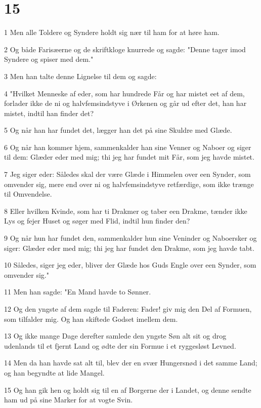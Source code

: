 \chapter{15}

\par 1 Men alle Toldere og Syndere holdt sig nær til ham for at høre ham.
\par 2 Og både Farisæerne og de skriftkloge knurrede og sagde: "Denne tager imod Syndere og spiser med dem."
\par 3 Men han talte denne Lignelse til dem og sagde:
\par 4 "Hvilket Menneske af eder, som har hundrede Får og har mistet eet af dem, forlader ikke de ni og halvfemsindstyve i Ørkenen og går ud efter det, han har mistet, indtil han finder det?
\par 5 Og når han har fundet det, lægger han det på sine Skuldre med Glæde.
\par 6 Og når han kommer hjem, sammenkalder han sine Venner og Naboer og siger til dem: Glæder eder med mig; thi jeg har fundet mit Får, som jeg havde mistet.
\par 7 Jeg siger eder: Således skal der være Glæde i Himmelen over een Synder, som omvender sig, mere end over ni og halvfemsindstyve retfærdige, som ikke trænge til Omvendelse.
\par 8 Eller hvilken Kvinde, som har ti Drakmer og taber een Drakme, tænder ikke Lys og fejer Huset og søger med Flid, indtil hun finder den?
\par 9 Og når hun har fundet den, sammenkalder hun sine Veninder og Naboersker og siger: Glæder eder med mig; thi jeg har fundet den Drakme, som jeg havde tabt.
\par 10 Således, siger jeg eder, bliver der Glæde hos Guds Engle over een Synder, som omvender sig."
\par 11 Men han sagde: "En Mand havde to Sønner.
\par 12 Og den yngste af dem sagde til Faderen: Fader! giv mig den Del af Formuen, som tilfalder mig. Og han skiftede Godset imellem dem.
\par 13 Og ikke mange Dage derefter samlede den yngste Søn alt sit og drog udenlands til et fjernt Land og ødte der sin Formue i et ryggesløst Levned.
\par 14 Men da han havde sat alt til, blev der en svær Hungersnød i det samme Land; og han begyndte at lide Mangel.
\par 15 Og han gik hen og holdt sig til en af Borgerne der i Landet, og denne sendte ham ud på sine Marker for at vogte Svin.
